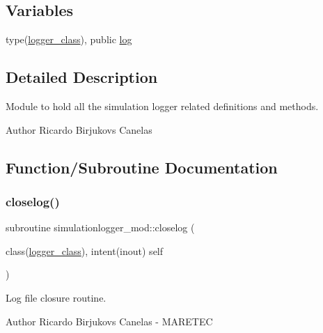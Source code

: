 \subsection*{Variables}
\begin{DoxyCompactItemize}
\item 
type(\mbox{\hyperlink{structsimulationlogger__mod_1_1logger__class}{logger\+\_\+class}}), public \mbox{\hyperlink{namespacesimulationlogger__mod_a0d667ffec2a1129f89f4bd8fe6dc8a43}{log}}
\end{DoxyCompactItemize}


\subsection{Detailed Description}
Module to hold all the simulation logger related definitions and methods. 

\begin{DoxyAuthor}{Author}
Ricardo Birjukovs Canelas 
\end{DoxyAuthor}


\subsection{Function/\+Subroutine Documentation}
\mbox{\label{namespacesimulationlogger__mod_a9cad2fd4ad67dc229286f94b0444cb86}} 
\subsubsection{\texorpdfstring{closelog()}{closelog()}}
{\footnotesize\ttfamily subroutine simulationlogger\+\_\+mod\+::closelog (\begin{DoxyParamCaption}\item[{class(\mbox{\hyperlink{structsimulationlogger__mod_1_1logger__class}{logger\+\_\+class}}), intent(inout)}]{self }\end{DoxyParamCaption})\hspace{0.3cm}{\ttfamily [private]}}



Log file closure routine. 

\begin{DoxyAuthor}{Author}
Ricardo Birjukovs Canelas -\/ M\+A\+R\+E\+T\+EC 
\end{DoxyAuthor}


